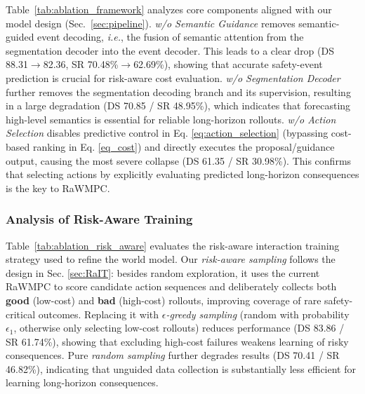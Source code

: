 \documentclass[twocolumn]{template}
\theoremstyle{thmstyleone}%
\theoremstyle{thmstyletwo}%
\theoremstyle{thmstylethree}%
\begin{document}
Table~\ref{tab:ablation_framework} analyzes core components aligned with our model design (Sec.~\ref{sec:pipeline}).
\emph{w/o Semantic Guidance} removes semantic-guided event decoding,
\textit{i.e.}, the fusion of semantic attention from the segmentation decoder into the event decoder.
This leads to a clear drop (DS 88.31$\rightarrow$82.36, SR 70.48\%$\rightarrow$62.69\%), showing that accurate safety-event prediction is crucial for risk-aware cost evaluation.
\emph{w/o Segmentation Decoder} further removes the segmentation decoding branch and its supervision, resulting in a large degradation (DS 70.85 / SR 48.95\%), which indicates that forecasting high-level semantics is essential for reliable long-horizon rollouts.
\emph{w/o Action Selection} disables predictive control in Eq. \eqref{eq:action_selection} (bypassing cost-based ranking in Eq. \eqref{eq_cost}) and directly executes the proposal/guidance output, causing the most severe collapse (DS 61.35 / SR 30.98\%).
This confirms that selecting actions by explicitly evaluating predicted long-horizon consequences is the key to RaWMPC.

\subsubsection{Analysis of Risk-Aware Training}

Table~\ref{tab:ablation_risk_aware} evaluates the risk-aware interaction training strategy used to refine the world model.
Our \emph{risk-aware sampling} follows the design in Sec. \ref{sec:RaIT}: besides random exploration, it uses the current RaWMPC to score candidate action sequences and deliberately collects both \textbf{good} (low-cost) and \textbf{bad} (high-cost) rollouts, improving coverage of rare safety-critical outcomes.
Replacing it with \emph{$\epsilon$-greedy sampling} (random with probability $\epsilon_1$, otherwise only selecting low-cost rollouts) reduces performance (DS 83.86 / SR 61.74\%), showing that excluding high-cost failures weakens learning of risky consequences.
Pure \emph{random sampling} further degrades results (DS 70.41 / SR 46.82\%), indicating that unguided data collection is substantially less efficient for learning long-horizon consequences.
\end{document}
